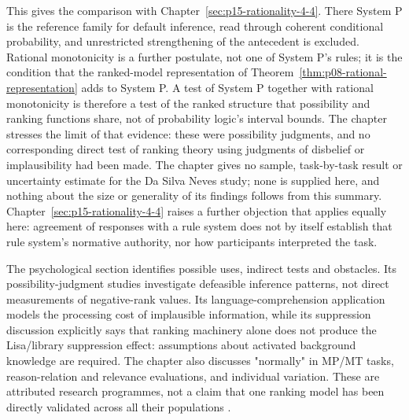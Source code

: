 This gives the comparison with Chapter~\ref{sec:p15-rationality-4-4}.  There
System P is the reference family for default inference, read through coherent
conditional probability, and unrestricted strengthening of the antecedent is
excluded.  Rational monotonicity is a further postulate, not one of System P's
rules; it is the condition that the ranked-model representation of
Theorem~\ref{thm:p08-rational-representation} adds to System P.  A test of
System P together with rational monotonicity is therefore a test of the ranked
structure that possibility and ranking functions share, not of probability
logic's interval bounds.  The chapter stresses the limit of that evidence:
these were possibility judgments, and no corresponding direct test of ranking
theory using judgments of disbelief or implausibility had been made.  The
chapter gives no sample, task-by-task result or uncertainty estimate for the
Da Silva Neves study; none is supplied here, and nothing about the size or
generality of its findings follows from this summary.  Chapter~\ref{sec:p15-rationality-4-4}
raises a further objection that applies equally here: agreement of responses
with a rule system does not by itself establish that rule system's normative
authority, nor how participants interpreted the task.

The psychological section identifies possible uses, indirect tests and
obstacles.  Its possibility-judgment studies investigate defeasible
inference patterns, not direct measurements of negative-rank values.
Its language-comprehension application models the processing cost of
implausible information, while its suppression discussion explicitly says
that ranking machinery alone does not produce the Lisa/library suppression
effect: assumptions about activated background knowledge are required.
The chapter also discusses "normally" in MP/MT tasks, reason-relation and
relevance evaluations, and individual variation.  These are attributed
research programmes, not a claim that one ranking model has been directly
validated across all their populations
\parencite[pp.~342--344]{KernIsbernerSkovgaardOlsenSpohn2021Ranking}.

